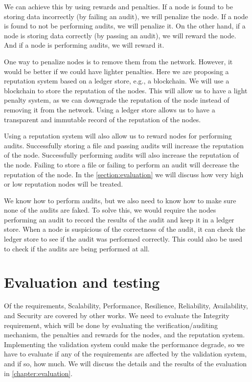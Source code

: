 We can achieve this by using rewards and penalties.
If a node is found to be storing data incorrectly (by failing an audit), we will penalize the node.
If a node is found to not be performing audits, we will penalize it.
On the other hand, if a node is storing data correctly (by passing an audit), we will reward the node.
And if a node is performing audits, we will reward it.

One way to penalize nodes is to remove them from the network.
However, it would be better if we could have lighter penalties.
Here we are proposing a reputation system based on a ledger store, e.g., a blockchain.
We will use a blockchain to store the reputation of the nodes.
This will allow us to have a light penalty system, as we can downgrade the reputation of the node
instead of removing it from the network.
Using a ledger store allows us to have a transparent and immutable record of the reputation of the nodes.

Using a reputation system will also allow us to reward nodes for performing audits.
Successfully storing a file and passing audits will increase the reputation of the node.
Successfully performing audits will also increase the reputation of the node.
Failing to store a file or failing to perform an audit will decrease the reputation of the node.
In the \ref{section:evaluation} we will discuss how very high or low reputation nodes will be treated.

We know how to perform audits, but we also need to know how to make sure none of the
audits are faked.
To solve this, we would require the nodes performing an audit to record the results of the audit and keep
it in a ledger store.
When a node is suspicious of the correctness of the audit, it can check the ledger store to see if the audit
was performed correctly.
This could also be used to check if the audits are being performed at all.

\label{section:evaluation}
\section{Evaluation and testing}

Of the requirements, Scalability, Performance, Resilience, Reliability, Availability, and Security
are covered by other works.
We need to evaluate the Integrity requirement, which will be done by evaluating the verification/auditing mechanism,
the penalties and rewards for the nodes, and the reputation system.
Implementing the validation system could make the performance degrade, so we have to evaluate
if any of the requirements are affected by the validation system, and if so, how much.
We will discuss the details and the results of the evaluation in \ref{chapter:evaluation}.
